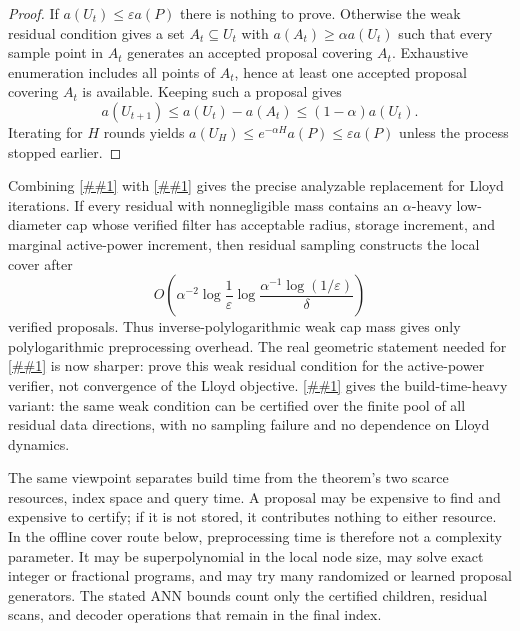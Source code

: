 \documentclass[10pt]{article}
\newcommand{\cref}[1]{\ref{##1}}
\newcommand{\Cref}[1]{\ref{##1}}
\theoremstyle{definition}
\begin{document}
\begin{proof}
   If $a(U_t)\le\varepsilon a(P)$ there is nothing to prove.  Otherwise the
   weak residual condition gives a set $A_t\subseteq U_t$ with
   $a(A_t)\ge\alpha a(U_t)$ such that every sample point in $A_t$ generates an
   accepted proposal covering $A_t$.  Exhaustive enumeration includes all
   points of $A_t$, hence at least one accepted proposal covering $A_t$ is
   available.  Keeping such a proposal gives
   \[
      a(U_{t+1})\le a(U_t)-a(A_t)\le(1-\alpha)a(U_t).
   \]
   Iterating for $H$ rounds yields
   $a(U_H)\le e^{-\alpha H}a(P)\le\varepsilon a(P)$ unless the process stopped
   earlier.
\end{proof}

Combining \cref{lem:residual-cap-seeding} with
\cref{lem:weak-residual-cover} gives the precise analyzable replacement for
Lloyd iterations.  If every residual with nonnegligible mass contains an
$\alpha$-heavy low-diameter cap whose verified filter has acceptable radius,
storage increment, and marginal active-power increment, then residual sampling
constructs the local cover after
\[
   O\!\left(
      \alpha^{-2}\log\frac1\varepsilon
      \log\frac{\alpha^{-1}\log(1/\varepsilon)}{\delta}
   \right)
\]
verified proposals.  Thus inverse-polylogarithmic weak cap mass gives only
polylogarithmic preprocessing overhead.  The real geometric statement needed
for \cref{asm:power-cover} is now sharper: prove this weak residual condition
for the active-power verifier, not convergence of the Lloyd objective.
\Cref{lem:exhaustive-residual-cover} gives the build-time-heavy variant: the
same weak condition can be certified over the finite pool of all residual data
directions, with no sampling failure and no dependence on Lloyd dynamics.

The same viewpoint separates build time from the theorem's two scarce
resources, index space and query time.  A proposal may be expensive to find and
expensive to certify; if it is not stored, it contributes nothing to either
resource.
In the offline cover route below, preprocessing time is therefore not a
complexity parameter.  It may be superpolynomial in the local node size, may
solve exact integer or fractional programs, and may try many randomized or
learned proposal generators.  The stated ANN bounds count only the certified
children, residual scans, and decoder operations that remain in the final
index.
\end{document}
